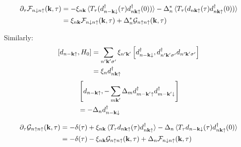 \documentclass[../main.tex]{subfiles}
\begin{document}
\begin{align}
    \pdif{\tau} \mathcal{F}_{n\downarrow n\uparrow} (\vb{k}, \tau) &=
    -\xi_{n \vb{k}} \braket{T_{\tau} (d_{n -\vb{k} \downarrow}^{\dagger} (\tau) d_{n \vb{k} \uparrow}^{\dagger} (0))} - \Delta_n^* \braket{T_{\tau} (d_{n \vb{k} \uparrow} (\tau) d_{n \vb{k} \uparrow}^{\dagger} (0))} \\
    &= \xi_{n \vb{k}} \mathcal{F}_{n \downarrow n \uparrow} (\vb{k}, \tau) + \Delta_{n}^* \mathcal{G}_{n\uparrow n\uparrow} (\vb{k}, \tau)
\end{align}

Similarly:
\begin{align}
    \left[ d_{n -\bm{\mathrm{k}} \uparrow}, H_0 \right]
    &= \sum_{n^{\prime} \bm{\mathrm{k}}^{\prime} \sigma^{\prime}} \xi_{n^{\prime} \bm{\mathrm{k}}^{\prime}} \left[ d_{n -\bm{\mathrm{k}} \downarrow}^{\dagger}, d_{n^{\prime} \bm{\mathrm{k}}^{\prime} \sigma^{\prime}}^{\dagger} d_{n^{\prime} \bm{\mathrm{k}}^{\prime} \sigma^{\prime}} \right] \\
    &= \xi_{n} d_{n \bm{\mathrm{k}} \uparrow}^{\dagger}
\end{align}
\begin{align}
    &\left[d_{n -\bm{\mathrm{k}} \uparrow}, -\sum_{m \bm{\mathrm{k}}^{\prime}} \Delta_{m} d_{m -\bm{\mathrm{k}}^{\prime} \uparrow}^{\dagger} d_{m -\bm{\mathrm{k}}^{\prime} \downarrow}^{\dagger} \right] \\
    &= - \Delta_n d_{n -\bm{\mathrm{k}} \downarrow}^{\dagger}
\end{align}

\begin{align}
    \pdif{\tau} \mathcal{G}_{n \uparrow n \uparrow} (\vb{k}, \tau) &=
    -\delta(\tau) + \xi_{n \vb{k}} \braket{T_{\tau} d_{n \vb{k} \uparrow} (\tau) d_{n \vb{k} \uparrow}^{\dagger}} - \Delta_n \braket{T_{\tau} d_{n -\vb{k} \downarrow} (\tau) d_{n \vb{k} \uparrow}^{\dagger} (0)} \\
    &= -\delta(\tau) - \xi_{n \vb{k}} \mathcal{G}_{n \uparrow n \uparrow} (\vb{k}, \tau) + \Delta_{n} \mathcal{F}_{n\downarrow n\uparrow} (\vb{k}, \tau) \\
\end{align}
\end{document}
